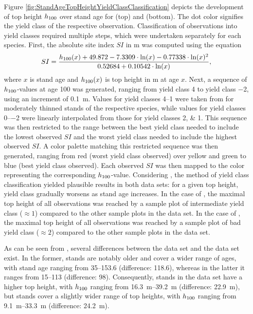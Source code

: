 Figure \ref{fig:StandAgeTopHeightYieldClassClassification} depicts the development of top height \(h_{100}\) over stand age for \Beech{} (top) and \Spruce{} (bottom).  The dot color signifies the yield class of the respective observation.  Classification of observations into yield classes required multiple steps, which were undertaken separately for each species.  First, the absolute site index \(SI\) in \si{\meter} was computed using the equation
\begin{equation}
  \label{eq:NagelFunctionSolvedForSI}
  SI = \frac{h_{100}(x) + 49.872 - 7.3309 \cdot \ln(x) - 0.77338 \cdot \ln(x)^2 }{0.52684 + 0.10542 \cdot \ln(x)} ,
\end{equation}
\parencite{Nagel1999} where \(x\) is stand age and \(h_{100}(x)\) is top height in \si{\meter} at age \(x\).  Next, a sequence of \(h_{100}{}\)-values at age \SI{100}{\year} was generated, ranging from yield class \num{4} to yield class \num{-2}, using an increment of \SI{0.1}{\meter}.  Values for yield classes \numrange{4}{1} were taken from \textcite{Schober1995} for moderately thinned stands of the respective species, while values for yield classes \numrange{0}{-2} were linearly interpolated from those for yield classes \numlist{2; 1}.   This sequence was then restricted to the range between the best yield class needed to include the lowest observed \(SI\) and the worst yield class needed to include the highest observed \(SI\).  A color palette matching this restricted sequence was then generated, ranging from red (worst yield class observed) over yellow and green to blue (best yield class observed).  Each observed \(SI\) was then mapped to the color representing the corresponding \(h_{100}{}\)-value.  Considering , the method of yield class classification yielded plausible results in both data sets:  for a given top height, yield class gradually worsens as stand age increases.   In the case of \Beech{}, the maximal top height of all observations was reached by a sample plot of intermediate yield class (\(\approx{} 1\)) compared to the other sample plots in the data set.   In the case of \Spruce{}, the maximal top height of all observations was reached by a sample plot of bad yield class (\(\approx{} 2\)) compared to the other sample plots in the data set.  

As can be seen from , several differences between the \Beech{} data set and the \Spruce{} data set exist.
In the former, stands are notably older and cover a wider range of ages, with stand age ranging from \SIrange{35}{153.6}{\year} (difference: \SI{118.6}{\year}), whereas in the latter it ranges from \SIrange{15}{113}{\year} (difference: \SI{98}{\year}).  Consequently, stands in the \Beech{} data set have a higher top height, with \(h_{100}\) ranging from \SIrange{16.3}{39.2}{\meter} (difference: \SI{22.9}{\meter}), but \Spruce{} stands cover a slightly wider range of top heights, with \(h_{100}{}\) ranging from \SIrange{9.1}{33.3}{\meter} (difference: \SI{24.2}{\meter}).

